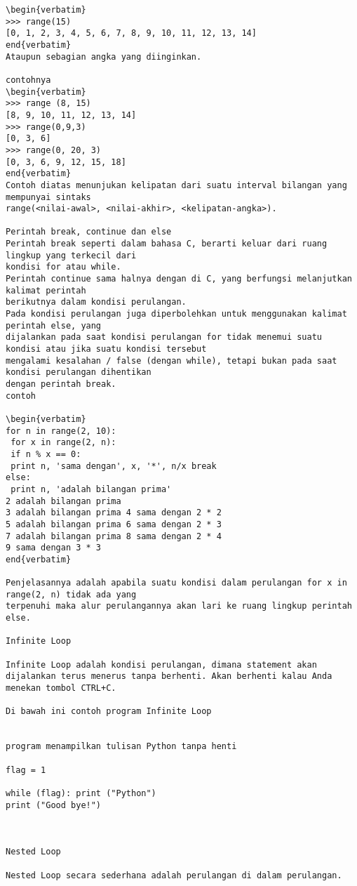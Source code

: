 \begin{verbatim}
\begin{verbatim}
>>> range(15)
[0, 1, 2, 3, 4, 5, 6, 7, 8, 9, 10, 11, 12, 13, 14]
end{verbatim}
Ataupun sebagian angka yang diinginkan.

contohnya
\begin{verbatim}
>>> range (8, 15)
[8, 9, 10, 11, 12, 13, 14]
>>> range(0,9,3)
[0, 3, 6]
>>> range(0, 20, 3)
[0, 3, 6, 9, 12, 15, 18] 
end{verbatim}
Contoh diatas menunjukan kelipatan dari suatu interval bilangan yang mempunyai sintaks
range(<nilai-awal>, <nilai-akhir>, <kelipatan-angka>). 

Perintah break, continue dan else
Perintah break seperti dalam bahasa C, berarti keluar dari ruang lingkup yang terkecil dari
kondisi for atau while.
Perintah continue sama halnya dengan di C, yang berfungsi melanjutkan kalimat perintah
berikutnya dalam kondisi perulangan.
Pada kondisi perulangan juga diperbolehkan untuk menggunakan kalimat perintah else, yang
dijalankan pada saat kondisi perulangan for tidak menemui suatu kondisi atau jika suatu kondisi tersebut
mengalami kesalahan / false (dengan while), tetapi bukan pada saat kondisi perulangan dihentikan
dengan perintah break.
contoh

\begin{verbatim}
for n in range(2, 10):
 for x in range(2, n):
 if n % x == 0:
 print n, 'sama dengan', x, '*', n/x break
else:
 print n, 'adalah bilangan prima'
2 adalah bilangan prima
3 adalah bilangan prima 4 sama dengan 2 * 2
5 adalah bilangan prima 6 sama dengan 2 * 3
7 adalah bilangan prima 8 sama dengan 2 * 4
9 sama dengan 3 * 3
end{verbatim}

Penjelasannya adalah apabila suatu kondisi dalam perulangan for x in range(2, n) tidak ada yang
terpenuhi maka alur perulangannya akan lari ke ruang lingkup perintah else. 
 
Infinite Loop 

Infinite Loop adalah kondisi perulangan, dimana statement akan dijalankan terus menerus tanpa berhenti. Akan berhenti kalau Anda menekan tombol CTRL+C.

Di bawah ini contoh program Infinite Loop

 
program menampilkan tulisan Python tanpa henti 

flag = 1 

while (flag): print ("Python") 
print ("Good bye!") 



Nested Loop 

Nested Loop secara sederhana adalah perulangan di dalam perulangan.


\end{verbatim}
